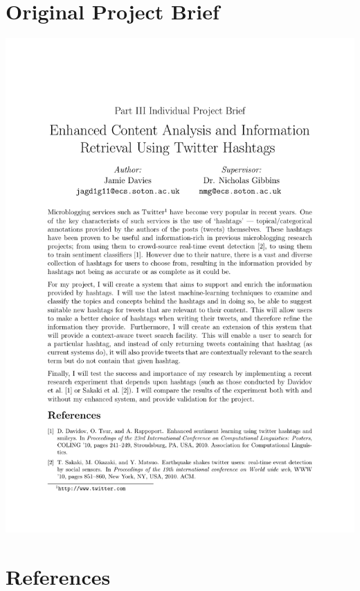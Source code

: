 \documentclass[11pt,a4paper]{report}
\begin{document}
\chapter{Original Project Brief}
\vspace*{-3cm}
\hspace*{-2.4cm}\includegraphics[scale=0.9]{../brief/brief.pdf}
\pagebreak

\setcounter{secnumdepth}{0}
\chapter{References}
{\footnotesize \printbibliography[heading=none]}
\end{document}
